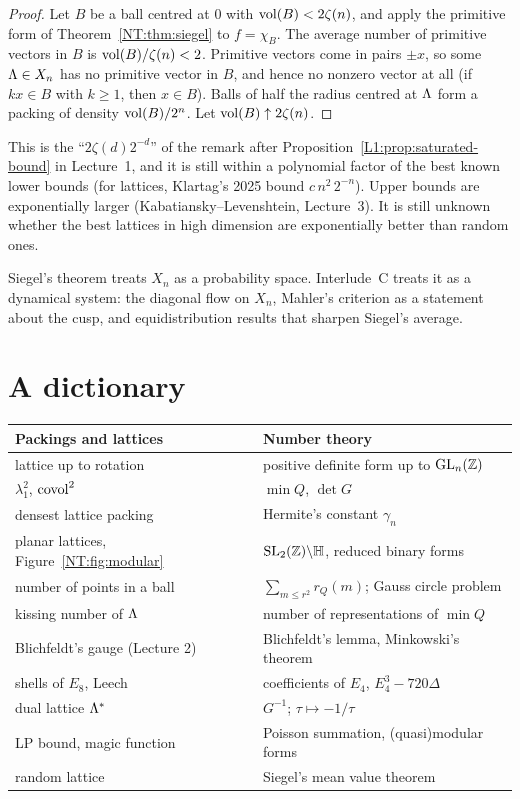 \begin{proof}
Let $B$ be a ball centred at $0$ with $\operatorname{vol}(B)<2\zeta(n)$, and apply the primitive form of
Theorem~\ref{NT:thm:siegel} to $f=\chi_B$. The average number of primitive vectors in $B$ is
$\operatorname{vol}(B)/\zeta(n)<2$. Primitive vectors come in pairs $\pm x$, so some $\Lambda\in X_n$ has no primitive
vector in $B$, and hence no nonzero vector at all (if $kx\in B$ with $k\ge1$, then $x\in B$). Balls of
half the radius centred at $\Lambda$ form a packing of density $\operatorname{vol}(B)/2^n$. Let
$\operatorname{vol}(B)\uparrow2\zeta(n)$.
\end{proof}

This is the ``$2\zeta(d)2^{-d}$'' of the remark after Proposition~\ref{L1:prop:saturated-bound} in
Lecture~1, and it is still within a polynomial factor of the best known lower bounds (for lattices,
Klartag's 2025 bound $c\,n^2\,2^{-n}$). Upper bounds are exponentially larger
(Kabatiansky--Levenshtein, Lecture~3). It is still unknown whether the best lattices in high dimension are
exponentially better than random ones.

Siegel's theorem treats $X_n$ as a probability space. Interlude~C treats it as a dynamical system: the
diagonal flow on $X_n$, Mahler's criterion as a statement about the cusp, and equidistribution results
that sharpen Siegel's average.

\section{A dictionary}
\label{NT:sec:dictionary}

\begin{center}
\renewcommand{\arraystretch}{1.25}
\begin{tabular}{p{}p{}}
\toprule
Packings and lattices & Number theory\\
\midrule
lattice up to rotation & positive definite form up to $\mathrm{GL}_n(\mathbb{Z})$\\
$\lambda_1^2$, $\operatorname{covol}^2$ & $\min Q$, $\det G$\\
densest lattice packing & Hermite's constant $\gamma_n$\\
planar lattices, Figure~\ref{NT:fig:modular} & $\mathrm{SL}_2(\mathbb{Z})\backslash\mathbb H$, reduced binary forms\\
number of points in a ball & $\sum_{m\le r^2}r_Q(m)$; Gauss circle problem\\
kissing number of $\Lambda$ & number of representations of $\min Q$\\
Blichfeldt's gauge (Lecture 2) & Blichfeldt's lemma, Minkowski's theorem\\
shells of $E_8$, Leech & coefficients of $E_4$, $E_4^3-720\Delta$\\
dual lattice $\Lambda^*$ & $G^{-1}$; $\tau\mapsto-1/\tau$\\
LP bound, magic function & Poisson summation, (quasi)modular forms\\
random lattice & Siegel's mean value theorem\\
\bottomrule
\end{tabular}
\end{center}

